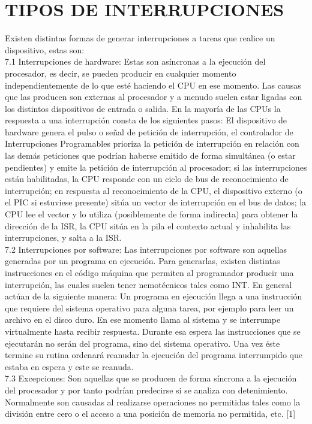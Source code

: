 \documentclass{article}
\begin{document}
\section{TIPOS DE INTERRUPCIONES}
Existen distintas formas de generar interrupciones a tareas que realice un dispositivo, estas son: \\
7.1 Interrupciones de hardware: Estas son asíncronas a la ejecución del procesador, es decir, se pueden producir en cualquier momento independientemente de lo que esté haciendo el CPU en ese momento. Las causas que las producen son externas al procesador y a menudo suelen estar ligadas con los distintos dispositivos de entrada o salida. En la mayoría de las CPUs la respuesta a una interrupción consta de los siguientes pasos:
El dispositivo de hardware genera el pulso o señal de petición de interrupción, el controlador de Interrupciones Programables prioriza la petición de interrupción en relación con las demás peticiones que podrían haberse emitido de forma simultánea (o estar pendientes) y emite la petición de interrupción al procesador; si las interrupciones están habilitadas, la CPU responde con un ciclo de bus de reconocimiento de interrupción; en respuesta al reconocimiento de la CPU, el dispositivo externo (o el PIC si estuviese presente) sitúa un vector de interrupción en el bus de datos; la CPU lee el vector y lo utiliza (posiblemente de forma indirecta) para obtener la dirección de la ISR, la CPU sitúa en la pila el contexto actual  y inhabilita las interrupciones, y salta a la ISR.\\

7.2 Interrupciones por software: Las interrupciones por software son aquellas generadas por un programa en ejecución. Para generarlas, existen distintas instrucciones en el código máquina que permiten al programador producir una interrupción, las cuales suelen tener nemotécnicos tales como INT.
En general actúan de la siguiente manera:
Un programa en ejecución llega a una instrucción que requiere del sistema operativo para alguna tarea, por ejemplo para leer un archivo en el disco duro. En ese momento llama al sistema y se interrumpe virtualmente hasta recibir respuesta. Durante esa espera las instrucciones que se ejecutarán no serán del programa, sino del sistema operativo. Una vez éste termine su rutina ordenará reanudar la ejecución del programa interrumpido que estaba en espera y este se reanuda. \\
7.3 Excepciones: Son aquellas que se producen de forma síncrona a la ejecución del procesador y por tanto podrían predecirse si se analiza con detenimiento. Normalmente son causadas al realizarse operaciones no permitidas tales como la división entre cero o el acceso a una posición de memoria no permitida, etc. [1]
\end{document}
